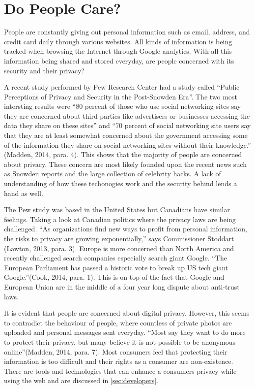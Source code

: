 \documentclass[12pt]{article}
\begin{document}
\section{Do People Care?}\label{sec:demand}

People are constantly giving out personal information such as email, address, and credit card daily through various websites. All kinds of information is being tracked when browsing the Internet through Google analytics. With all this information being shared and stored everyday, are people concerned with its security and their privacy?

A recent study performed by Pew Research Center had a study called ``Public Perceptions of Privacy and Security in the Post-Snowden Era''. The two most intersting results were ``80 percent of those who use social networking sites say they are concerned about third parties like advertisers or businesses accessing the data they share on these sites'' and ``70 percent of social networking site users say that they are at least somewhat concerned about the government accessing some of the information they share on social networking sites without their knowledge.'' (Madden, 2014, para. 4). This shows that the majority of people are concerned about privacy. These concern are most likely founded upon the recent news such as Snowden reports and the large collection of celebrity hacks. A lack of understanding of how these techonogies work and the security behind lends a hand as well.

The Pew study was based in the United States but Canadians have similar feelings. Taking a look at Canadian politics where the privacy laws are being challenged. ``As organizations find new ways to profit from personal information, the risks to privacy are growing exponentially,'' says Commissioner Stoddart (Lawton, 2013, para. 3). Europe is more concerned than North America and recently challenged search companies especially search giant Google. ``The European Parliament has passed a historic vote to break up US tech giant Google.''(Cook, 2014, para. 1). This is on top of the fact that Google and European Union are in the middle of a four year long dispute about anti-trust laws.

It is evident that people are concerned about digital privacy. However, this seems to contradict the behaviour of people, where countless of private photos are uploaded and personal messages sent everyday. ``Most say they want to do more to protect their privacy, but many believe it is not possible to be anonymous online''(Madden, 2014, para. 7). Most consumers feel that protecting their information is too difficult and their rights as a consumer are non-existence. There are tools and technologies that can enhance a consumers privacy while using the web and are discussed in \ref{sec:developers}. 
\end{document}
